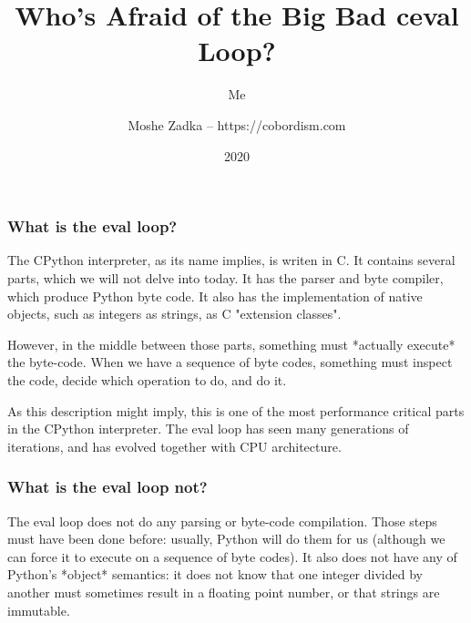 \usepackage{hyperref}
\usepackage{graphicx}
\usepackage{listings}
\usepackage{textcomp}
\usepackage{fancyvrb}


\title{Who's Afraid of the Big Bad ceval Loop?}
\subtitle{Me}
\author{Moshe Zadka -- https://cobordism.com}
\date{2020}


\begin{titlepage}
\maketitle
\end{titlepage}

\frame{\titlepage}

\begin{frame}
\frametitle{What is the eval loop?}
\end{frame}

The CPython interpreter,
as its name implies,
is writen in C.
It contains several parts,
which we will not delve into today.
It has the parser and byte compiler,
which produce Python byte code.
It also has the implementation of
native objects,
such as integers as strings,
as C
"extension classes".

However,
in the middle between those parts,
something must
*actually execute*
the byte-code.
When we have a sequence of byte codes,
something must inspect the code,
decide which operation to do,
and do it.

As this description might imply,
this is one of the most performance critical parts
in the CPython interpreter.
The eval loop has seen many generations of iterations,
and has evolved together with CPU architecture.


\begin{frame}
\frametitle{What is the eval loop not?}
\end{frame}

The eval loop does not do any parsing or byte-code compilation.
Those steps must have been done before:
usually,
Python will do them for us
(although we can force it to execute on a sequence
of byte codes).
It also does not have any of Python's
*object*
semantics:
it does not know that one integer divided by another must sometimes
result in a floating point number,
or that strings are immutable.

